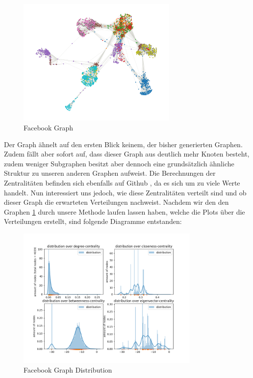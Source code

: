 \FloatBarrier
\begin{figure}[h!]%
  \centering
 \includegraphics[width=0.7\textwidth]{Graphics/FacebookPoliticalPlot.png}
  \caption{Facebook Graph}
  \label{fig:FacebookGraph}
\end{figure}
\FloatBarrier



Der Graph ähnelt auf den ersten Blick keinem, der bisher generierten Graphen. Zudem fällt aber sofort auf, dass dieser Graph aus deutlich mehr Knoten besteht, zudem weniger Subgraphen besitzt aber dennoch eine grundsätzlich ähnliche Struktur zu unseren anderen Graphen aufweist. Die Berechnungen der Zentralitäten befinden sich ebenfalls auf Github \cite{TZ}, da es sich um zu viele Werte handelt. Nun interessiert uns jedoch, wie diese Zentralitäten verteilt sind und ob dieser Graph die erwarteten Verteilungen nachweist. Nachdem wir den den Graphen \ref{fig:FacebookGraph} durch unsere Methode laufen lassen haben, welche die Plots über die Verteilungen erstellt, sind folgende Diagramme entstanden:

\FloatBarrier
\begin{figure}[h!]%
  \centering
\includegraphics[width=0.8\textwidth]{Graphics/facebookLOG.png}
  \caption{Facebook Graph Distribution}
  \label{fig:FacebookGraphDistribution}
\end{figure}
\FloatBarrier

